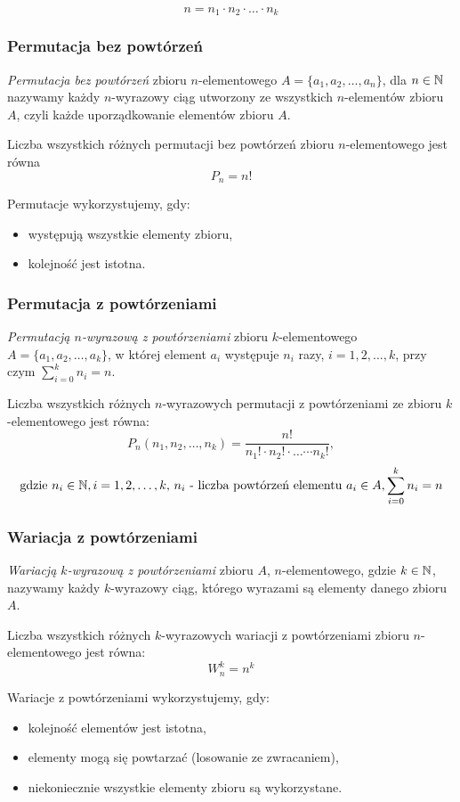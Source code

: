 \documentclass[../Matematyka.tex]{subfiles}
\begin{document}
    \[n = n_1 \cdot n_2 \cdot \ldots \cdot n_k\]

    \subsubsection{Permutacja bez powtórzeń}
    \textit{Permutacja bez powtórzeń} zbioru \(n\)-elementowego \(A = \{a_1, a_2, \ldots, a_n\}\), dla
    \(n \in \mathbb{N}\) nazywamy każdy \(n\)-wyrazowy ciąg utworzony ze wszystkich \(n\)-elementów zbioru
    \(A\), czyli każde uporządkowanie elementów zbioru \(A\).

    Liczba wszystkich różnych permutacji bez powtórzeń zbioru \(n\)-elementowego jest równa
    \[P_n = n!\]

    Permutacje wykorzystujemy, gdy:
    \begin{itemize}
        \item występują wszystkie elementy zbioru,
        \item kolejność jest istotna.
    \end{itemize}

    \subsubsection{Permutacja z powtórzeniami}
    \textit{Permutacją \(n\)-wyrazową z powtórzeniami} zbioru \(k\)-elementowego
    \(A = \{a_1, a_2, \ldots, a_k\}\), w której element \(a_i\) występuje \(n_i\) razy, \(i = 1, 2, \ldots, k\), przy czym \(\sum_{i=0}^{k}n_i = n\).

    Liczba wszystkich różnych \(n\)-wyrazowych permutacji z powtórzeniami ze zbioru \(k\)-elementowego jest równa:
    \[P_n(n_1, n_2, \ldots, n_k) = \frac{n!}{n_1! \cdot n_2! \cdot \ldots \cdots n_k!},\]
    \[\text{gdzie } n_i \in \mathbb{N}, i=1,2,\ldots,k \text{, } n_i \text{ - liczba powtórzeń elementu } a_i \in A, \sum_{i=0}^{k}n_i = n\]

    \subsubsection{Wariacja z powtórzeniami}
    \textit{Wariacją \(k\)-wyrazową z powtórzeniami} zbioru \(A\), \(n\)-elementowego, gdzie \(k\in\mathbb{N}\), 
    nazywamy każdy \(k\)-wyrazowy ciąg, którego wyrazami są elementy danego zbioru \(A\).

    Liczba wszystkich różnych \(k\)-wyrazowych wariacji z powtórzeniami zbioru \(n\)-elementowego jest równa:
    \[W_n^k=n^k\]

    Wariacje z powtórzeniami wykorzystujemy, gdy:
    \begin{itemize}
        \item kolejność elementów jest istotna,
        \item elementy mogą się powtarzać (losowanie ze zwracaniem),
        \item niekoniecznie wszystkie elementy zbioru są wykorzystane.
    \end{itemize}
\end{document}
